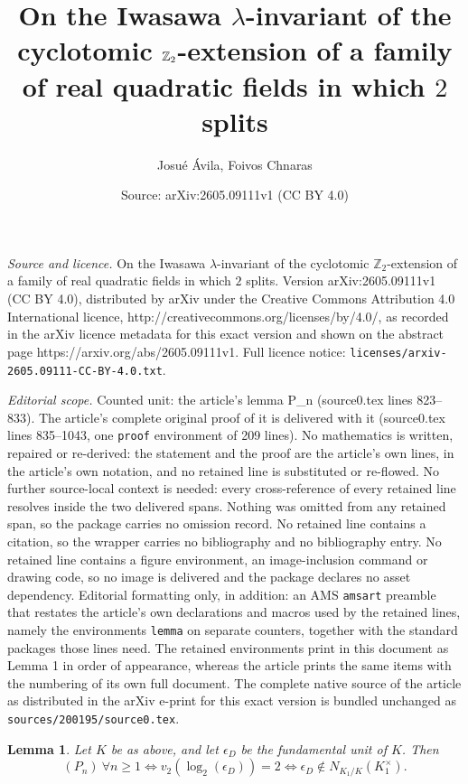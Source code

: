 \documentclass[10pt,a4paper]{amsart}
\title{On the Iwasawa $\lambda$-invariant of the cyclotomic $\Z_2$-extension of a family of real quadratic fields in which $2$ splits}
\author{Josu\'e \'Avila, Foivos Chnaras}
\date{Source: arXiv:2605.09111v1 (CC BY 4.0)}
\newtheorem{lemma}{Lemma}
\newcommand{\Z}{\mathbb{Z}}
\begin{document}
\maketitle

\noindent\emph{Source and licence.} On the Iwasawa $\lambda$-invariant of the cyclotomic $\Z_2$-extension of a family of real quadratic fields in which $2$ splits. Version arXiv:2605.09111v1 (CC BY 4.0), distributed by arXiv under the Creative Commons Attribution 4.0 International licence, http://creativecommons.org/licenses/by/4.0/, as recorded in the arXiv licence metadata for this exact version and shown on the abstract page https://arxiv.org/abs/2605.09111v1. Full licence notice: \texttt{licenses/arxiv-2605.09111-CC-BY-4.0.txt}.\par\smallskip

\noindent\textit{Editorial scope.} Counted unit: the article's lemma P\_n (source0.tex lines 823--833). The article's complete original proof of it is delivered with it (source0.tex lines 835--1043, one \texttt{proof} environment of 209 lines). No mathematics is written, repaired or re-derived: the statement and the proof are the article's own lines, in the article's own notation, and no retained line is substituted or re-flowed.  No further source-local context is needed: every cross-reference of every retained line resolves inside the two delivered spans.  Nothing was omitted from any retained span, so the package carries no omission record.  No retained line contains a citation, so the wrapper carries no bibliography and no bibliography entry.  No retained line contains a figure environment, an image-inclusion command or drawing code, so no image is delivered and the package declares no asset dependency.  Editorial formatting only, in addition: an AMS \texttt{amsart} preamble that restates the article's own declarations and macros used by the retained lines, namely the environments \texttt{lemma} on separate counters, together with the standard packages those lines need.  The retained environments print in this document as Lemma 1 in order of appearance, whereas the article prints the same items with the numbering of its own full document.  The complete native source of the article as distributed in the arXiv e-print for this exact version is bundled unchanged as \texttt{sources/200195/source0.tex}.
\begin{lemma} \label{lem: property P_n}
Let $K$ be as above, and let $\epsilon_D$ be the fundamental unit of $K$.
Then
$$
(P_n)\ \forall n\ge 1
\iff
v_2(\log_2(\epsilon_D))=2
\iff
\epsilon_D\notin N_{K_1/K}(K_1^\times).
$$
\end{lemma}
\end{document}
